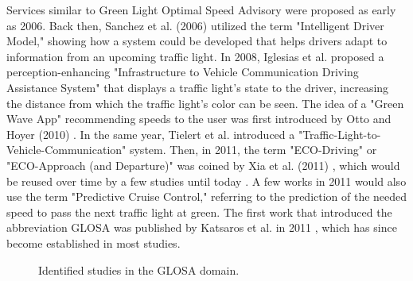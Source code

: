 Services similar to Green Light Optimal Speed Advisory were proposed as early as 2006. Back then, Sanchez et al. (2006) \cite{sanchez_predicting_2006} utilized the term "Intelligent Driver Model," showing how a system could be developed that helps drivers adapt to information from an upcoming traffic light. In 2008, Iglesias et al. \cite{iglesias_i2v_2008} proposed a perception-enhancing "Infrastructure to Vehicle Communication Driving Assistance System" that displays a traffic light's state to the driver, increasing the distance from which the traffic light's color can be seen. The idea of a "Green Wave App" recommending speeds to the user was first introduced by Otto and Hoyer (2010) \cite{otto_operating_2010}. In the same year, Tielert et al. \cite{tielert_impact_2010} introduced a "Traffic-Light-to-Vehicle-Communication" system. Then, in 2011, the term "ECO-Driving" or "ECO-Approach (and Departure)" was coined by Xia et al. (2011) \cite{xia_indirect_2011}, which would be reused over time by a few studies until today \cite{rakha_eco-driving_2011, rakha_aeris_2012, xia_field_2012, hao_eco-approach_2019, hu_lane-level_2023}. A few works in 2011 \cite{asadi_predictive_2011, raubitschek_predictive_2011} would also use the term "Predictive Cruise Control," referring to the prediction of the needed speed to pass the next traffic light at green. The first work that introduced the abbreviation GLOSA was published by Katsaros et al. in 2011 \cite{katsaros_performance_2011}, which has since become established in most studies.

\begin{figure}[t]
\centering
{}
\caption{Identified studies in the GLOSA domain.}
\label{fig:related-work-research-method}
\end{figure}

